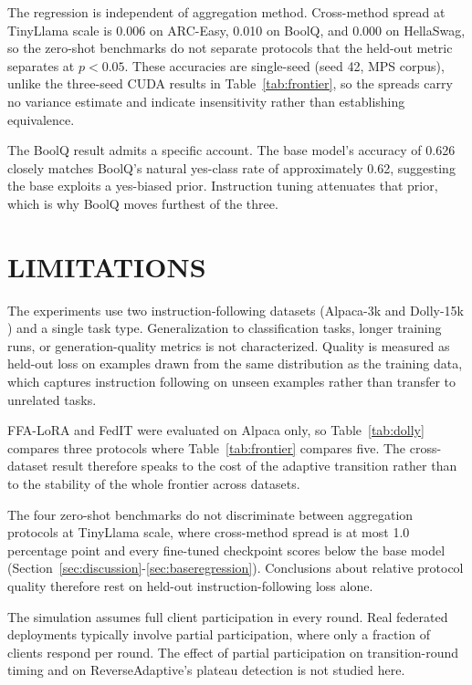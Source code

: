 The regression is independent of aggregation method. Cross-method spread at TinyLlama scale is 0.006 on ARC-Easy, 0.010 on BoolQ, and 0.000 on HellaSwag, so the zero-shot benchmarks do not separate protocols that the held-out metric separates at $p < 0.05$. These accuracies are single-seed (seed 42, MPS corpus), unlike the three-seed CUDA results in Table~\ref{tab:frontier}, so the spreads carry no variance estimate and indicate insensitivity rather than establishing equivalence.

The BoolQ result admits a specific account. The base model's accuracy of 0.626 closely matches BoolQ's natural yes-class rate of approximately 0.62, suggesting the base exploits a yes-biased prior. Instruction tuning attenuates that prior, which is why BoolQ moves furthest of the three.

\section{LIMITATIONS}
\label{sec:limitations}

The experiments use two instruction-following datasets (Alpaca-3k \cite{taori2023alpaca} and Dolly-15k \cite{dolly2023}) and a single task type. Generalization to classification tasks, longer training runs, or generation-quality metrics is not characterized. Quality is measured as held-out loss on examples drawn from the same distribution as the training data, which captures instruction following on unseen examples rather than transfer to unrelated tasks.

FFA-LoRA and FedIT were evaluated on Alpaca only, so Table~\ref{tab:dolly} compares three protocols where Table~\ref{tab:frontier} compares five. The cross-dataset result therefore speaks to the cost of the adaptive transition rather than to the stability of the whole frontier across datasets.

The four zero-shot benchmarks do not discriminate between aggregation protocols at TinyLlama scale, where cross-method spread is at most 1.0 percentage point and every fine-tuned checkpoint scores below the base model (Section~\ref{sec:discussion}-\ref{sec:baseregression}). Conclusions about relative protocol quality therefore rest on held-out instruction-following loss alone.

The simulation assumes full client participation in every round. Real federated deployments typically involve partial participation, where only a fraction of clients respond per round. The effect of partial participation on transition-round timing and on ReverseAdaptive's plateau detection is not studied here.

